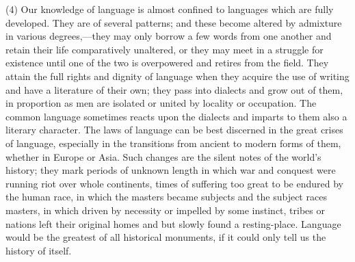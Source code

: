 \documentclass[11pt,letter]{article}
\begin{document}
\par  (4) Our knowledge of language is almost confined to languages which are fully developed. They are of several patterns; and these become altered by admixture in various degrees,—they may only borrow a few words from one another and retain their life comparatively unaltered, or they may meet in a struggle for existence until one of the two is overpowered and retires from the field. They attain the full rights and dignity of language when they acquire the use of writing and have a literature of their own; they pass into dialects and grow out of them, in proportion as men are isolated or united by locality or occupation. The common language sometimes reacts upon the dialects and imparts to them also a literary character. The laws of language can be best discerned in the great crises of language, especially in the transitions from ancient to modern forms of them, whether in Europe or Asia. Such changes are the silent notes of the world’s history; they mark periods of unknown length in which war and conquest were running riot over whole continents, times of suffering too great to be endured by the human race, in which the masters became subjects and the subject races masters, in which driven by necessity or impelled by some instinct, tribes or nations left their original homes and but slowly found a resting-place. Language would be the greatest of all historical monuments, if it could only tell us the history of itself.
\end{document}
